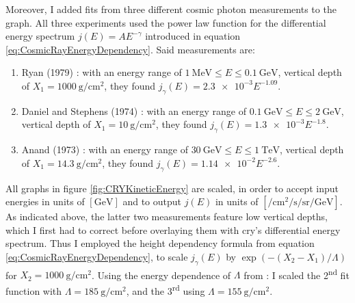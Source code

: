Moreover, I added fits from three different cosmic photon measurements to the graph. All three experiments used the power law function for the differential energy spectrum $j(E) = AE^{-\gamma}$ introduced in equation \ref{eq:CosmicRayEnergyDependency}. Said measurements are:
\begin{enumerate}
    \item Ryan \etal (1979) \cite{CosmicGammaSpectrumFit1}: with an energy range of $\SI{1}{\mega\electronvolt} \leq E \leq \SI{0.1}{\giga\electronvolt}$, vertical depth of $X_1 = \SI{1000}{\gram\per\centi\metre\squared}$, they found $j_\gamma(E) = \num{2.3e-3}E^{-1.09}$.
    \item Daniel and Stephens (1974) \cite{CosmicGammaSpectrumFit2}: with an energy range of $\SI{0.1}{\giga\electronvolt} \leq E \leq \SI{2}{\giga\electronvolt}$, vertical depth of $X_1 = \SI{10}{\gram\per\centi\metre\squared}$, they found $j_\gamma(E) = \num{1.3e-3}E^{-1.8}$.
    \item Anand \etal (1973) \cite{CosmicGammaSpectrumFit3}: with an energy range of $\SI{30}{\giga\electronvolt} \leq E \leq \SI{1}{\tera\electronvolt}$, vertical depth of $X_1 = \SI{14.3}{\gram\per\centi\metre\squared}$, they found $j_\gamma(E) = \num{1.14e-2}E^{-2.6}$.
\end{enumerate}
All graphs in figure \ref{fig:CRYKineticEnergy} are scaled, in order to accept input energies in units of $[\si{\giga\electronvolt}]$ and to output $j(E)$ in units of $[\si{\per\centi\metre\squared\per\second\per\steradian\per\giga\electronvolt}]$. As indicated above, the latter two measurements feature low vertical depths, which I first had to correct before overlaying them with \gls{cry}'s differential energy spectrum. Thus I employed the height dependency formula from equation \ref{eq:CosmicRayEnergyDependency}, to scale $j_\gamma(E)$ by $\exp(-(X_2-X_1)/\Lambda)$ for $X_2 = \SI{1000}{\gram\per\centi\metre\squared}$. Using the energy dependence of $\Lambda$ from \cite{CosmicGammaSpectrumFit2}: I scaled the 2\textsuperscript{nd} fit function with $\Lambda = \SI{185}{\gram\per\centi\metre\squared}$, and the 3\textsuperscript{rd} using $\Lambda = \SI{155}{\gram\per\centi\metre\squared}$.

